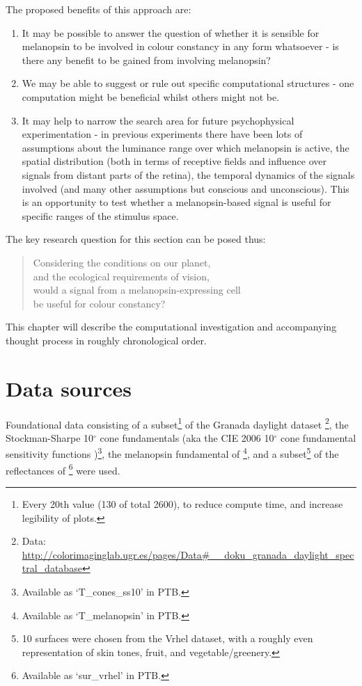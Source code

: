 \noindent The proposed benefits of this approach are: 
\begin{enumerate}
    \item It may be possible to answer the question of whether it is sensible for melanopsin to be involved in colour constancy in any form whatsoever - is there any benefit to be gained from involving melanopsin?
    \item We may be able to suggest or rule out specific computational structures - one computation might be beneficial whilst others might not be.
    \item It may help to narrow the search area for future psychophysical experimentation - in previous experiments there have been lots of assumptions about the luminance range over which melanopsin is active, the spatial distribution (both in terms of receptive fields and influence over signals from distant parts of the retina), the temporal dynamics of the signals involved (and many other assumptions but conscious and unconscious). This is an opportunity to test whether a melanopsin-based signal is useful for specific ranges of the stimulus space.
\end{enumerate}

\noindent The key research question for this section can be posed thus:

\begin{quote}
\centering 
Considering the conditions on our planet, \\
and the ecological requirements of vision, \\
would a signal from a melanopsin-expressing cell \\
be useful for colour constancy?
\end{quote}

This chapter will describe the computational investigation and accompanying thought process in roughly chronological order.

\section{Data sources}

Foundational data consisting of 
a subset\footnote{Every 20th value (130 of total 2600), to reduce compute time, and increase legibility of plots.} of the Granada daylight dataset 
\citep{hernandez-andres_color_2001}\footnote{Data: \url{http://colorimaginglab.ugr.es/pages/Data\#__doku_granada_daylight_spectral_database}},
the Stockman-Sharpe 10$^{\circ}$ cone fundamentals 
\citep{stockman_spectral_2000,stockman_spectral_1999}
(aka the CIE 2006 10$^{\circ}$ cone fundamental sensitivity functions \cite{cie_cie_2006})\footnote{Available as `T\_cones\_ss10' in \gls{PTB}.},
the melanopsin fundamental of \citet{lucas_measuring_2014}\footnote{Available as `T\_melanopsin' in \gls{PTB}.},
and a subset\footnote{10 surfaces were chosen from the Vrhel dataset, with a roughly even representation of skin tones, fruit, and vegetable/greenery.} 
of the reflectances of \citet{vrhel_measurement_1994}\footnote{Available as `sur\_vrhel' in \gls{PTB}.}
were used.


